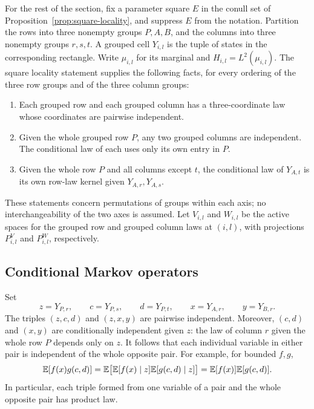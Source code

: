 For the rest of the section, fix a parameter square $E$ in the conull set
of Proposition~\ref{prop:square-locality}, and suppress $E$ from the
notation.  Partition the rows into three nonempty groups $P,A,B$, and the
columns into three nonempty groups $r,s,t$.  A grouped cell $Y_{i,l}$ is
the tuple of states in the corresponding rectangle.  Write $\mu_{i,l}$
for its marginal and $H_{i,l}=L^2(\mu_{i,l})$.
The square locality statement supplies the following facts, for every
ordering of the three row groups and of the three column groups:
\begin{enumerate}
\item Each grouped row and each grouped column has a three-coordinate
law whose coordinates are pairwise independent.
\item Given the whole grouped row $P$, any two grouped columns are
independent.  The conditional law of each uses only its own entry in $P$.
\item Given the whole row $P$ and all columns except $t$, the conditional
law of $Y_{A,t}$ is its own row-law kernel given $Y_{A,r},Y_{A,s}$.
\end{enumerate}
These statements concern permutations of groups within each axis; no
interchangeability of the two axes is assumed.
Let $V_{i,l}$ and $W_{i,l}$ be the active spaces for the grouped row and
grouped column laws at $(i,l)$, with projections $P^V_{i,l}$ and
$P^W_{i,l}$, respectively.

\subsection{Conditional Markov operators}

Set
\[
 z=Y_{P,r},\qquad c=Y_{P,s},\qquad d=Y_{P,t},\qquad
 x=Y_{A,r},\qquad y=Y_{B,r}.
\]
The triples $(z,c,d)$ and $(z,x,y)$ are pairwise independent.  Moreover,
$(c,d)$ and $(x,y)$ are conditionally independent given $z$: the law of
column $r$ given the whole row $P$ depends only on $z$.
It follows that each individual variable in either pair is independent
of the whole opposite pair.  For example, for bounded $f,g$,
\[
 \mathbb E[f(x)g(c,d)]
 =\mathbb E\bigl[\mathbb E[f(x)\mid z]\mathbb E[g(c,d)\mid z]\bigr]
 =\mathbb E[f(x)]\mathbb E[g(c,d)].
\]
In particular, each triple formed from one variable of a pair and the
whole opposite pair has product law.

